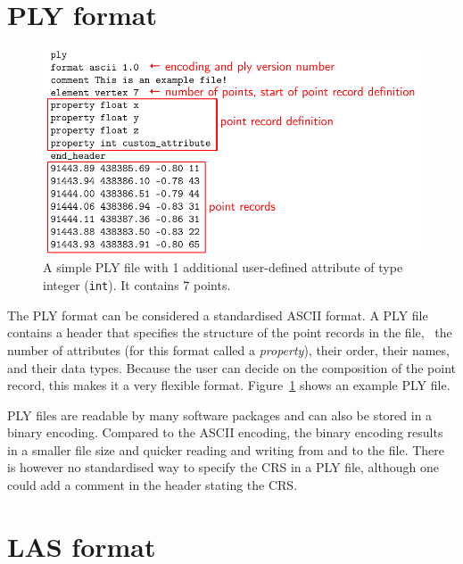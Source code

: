 %
\section{PLY format}%

\begin{figure}
  \includegraphics[width=\linewidth]{ply_header.pdf}
  \caption{A simple PLY file with 1 additional user-defined attribute of type integer (\texttt{int}). It contains 7 points.}%
\label{fig:ply}
\end{figure}
The PLY format can be considered a standardised ASCII format.
A PLY file contains a header that specifies the structure of the point records in the file, \ie\ the number of attributes (for this format called a \emph{property}), their order, their names, and their data types.
Because the user can decide on the composition of the point record, this makes it a very flexible format.
Figure~\ref{fig:ply} shows an example PLY file.

%

PLY files are readable by many software packages and can also be stored in a binary encoding.
Compared to the ASCII encoding, the binary encoding results in a smaller file size and quicker reading and writing from and to the file.
There is however no standardised way to specify the CRS in a PLY file, although one could add a comment in the header stating the CRS\@.


%
\section{LAS format}%
\label{sec:lasformat}%


